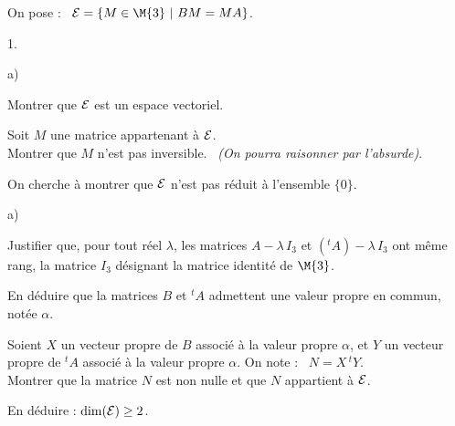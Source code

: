 \documentclass[11pt]{article}%
\begin{document}
  \noindent
  On pose : \ ${\cal E} = \{M \in \M{3} \ | \ BM=MA \}$.
  
\begin{noliste}{1.}
  \setlength{\itemsep}{4mm}
  \setcounter{enumi}{3}
  \item 
  \begin{noliste}{a)}
    \setlength{\itemsep}{2mm}
    \item Montrer que ${\cal E}$ est un espace vectoriel.
    
    
    
  \item Soit $M$ une matrice appartenant à ${\cal E}$.\\
    Montrer que $M$ n'est pas inversible. \ {\it (On pourra raisonner
      par l'absurde)}.
    
    
  \end{noliste}
  
  \item On cherche à montrer que ${\cal E}$ n'est pas réduit à 
  l'ensemble $\{0\}$.
  \begin{noliste}{a)}
    \setlength{\itemsep}{2mm}
    \item Justifier que, pour tout réel $\lambda$, les matrices 
    $A-\lambda \, I_3$ et $({}^t A)- \lambda \, I_3$ ont même rang, 
    la matrice $I_3$ désignant la matrice identité de $\M{3}$.
    
    
    
    

    
    \item En déduire que la matrices $B$ et ${}^t A$ admettent une 
    valeur propre en commun, notée $\alpha$.
    
    
    
  \item Soient $X$ un vecteur propre de $B$ associé à la valeur propre
    $\alpha$, et $Y$ un vecteur propre de ${}^t A$ associé à la
    valeur propre $\alpha$. On note : \ $N=X \, {}^t Y$.\\
    Montrer que la matrice $N$ est non nulle et que $N$ appartient à
    ${\cal E}$.
    
    
    
    

    
  \item En déduire : $\dim({\cal E}) \geq 2$.
    
    

  \end{noliste}
\end{noliste}
\end{document}
